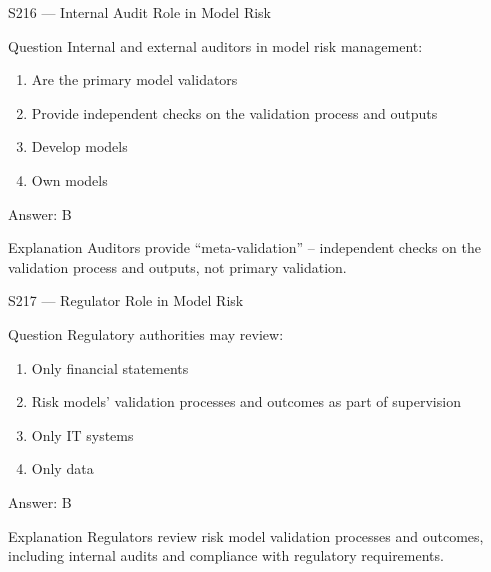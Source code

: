 \documentclass[aspectratio=169,8pt]{beamer}
\begin{document}
\begin{frame}{S216 --- Internal Audit Role in Model Risk}
	\begin{block}{Question}
		Internal and external auditors in model risk management:
		\begin{enumerate}
			\item Are the primary model validators
			\item Provide independent checks on the validation process and outputs
			\item Develop models
			\item Own models
		\end{enumerate}
	\end{block}
	\begin{exampleblock}{Answer: B}\end{exampleblock}
	\begin{block}{Explanation}
		Auditors provide ``meta-validation'' -- independent checks on the validation process and outputs, not primary validation.
	\end{block}
\end{frame}

\begin{frame}{S217 --- Regulator Role in Model Risk}
	\begin{block}{Question}
		Regulatory authorities may review:
		\begin{enumerate}
			\item Only financial statements
			\item Risk models' validation processes and outcomes as part of supervision
			\item Only IT systems
			\item Only data
		\end{enumerate}
	\end{block}
	\begin{exampleblock}{Answer: B}\end{exampleblock}
	\begin{block}{Explanation}
		Regulators review risk model validation processes and outcomes, including internal audits and compliance with regulatory requirements.
	\end{block}
\end{frame}
\end{document}
